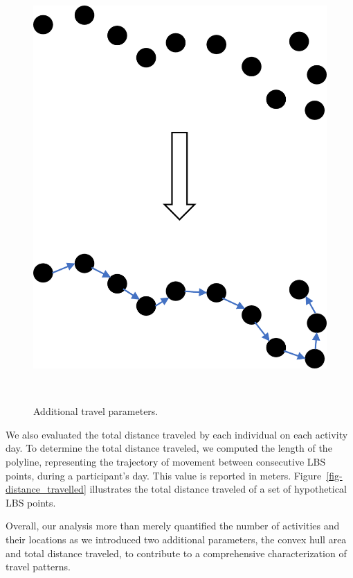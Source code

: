 \documentclass[
  letterpaper,
  number,
  review,
  3p]{elsarticle}
\begin{document}
\begin{figure}[H]
\begin{minipage}{0.40\linewidth}
{\includegraphics{distance_travelled.png}

}


\end{minipage}%
%
\begin{minipage}{0.05\linewidth}
~\end{minipage}%

\caption{\label{fig-travel_params}Additional travel parameters.}

\end{figure}%

We also evaluated the total distance traveled by each individual on each
activity day. To determine the total distance traveled, we computed the
length of the polyline, representing the trajectory of movement between
consecutive LBS points, during a participant's day. This value is
reported in meters. Figure~\ref{fig-distance_travelled} illustrates the
total distance traveled of a set of hypothetical LBS points.

Overall, our analysis more than merely quantified the number of
activities and their locations as we introduced two additional
parameters, the convex hull area and total distance traveled, to
contribute to a comprehensive characterization of travel patterns.
\end{document}
